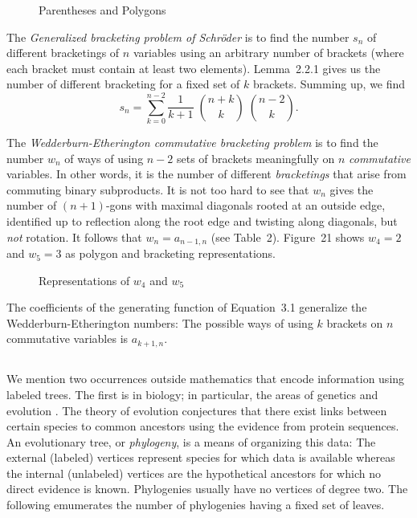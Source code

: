 \documentclass[10pt]{amsart}
\begin{document}
            \begin{figure}[h]
            \caption{Parentheses and Polygons}
            \label{k4}
            \end{figure}
            
            The {\em Generalized bracketing problem of Schr\"oder} is to find the number $s_n$ of different bracketings of $n$ variables using an arbitrary number of brackets (where each bracket must contain at least two elements).  Lemma~2.2.1 gives us the number of different bracketing for a fixed set of $k$ brackets.  Summing up, we find
            $$s_n = \sum_{k=0}^{n-2} \frac{1}{k+1} \; \binom{n+k}{k} \; \binom{n-2}{k}.$$
            
            The {\em Wedderburn-Etherington commutative bracketing problem} is to find the number $w_n$ of ways of using $n-2$ sets of brackets meaningfully on $n$ {\em commutative} variables. In other words, it is the number of different {\em bracketings} that arise from commuting binary subproducts. It is not too hard to see that $w_n$ gives the number of $(n+1)$-gons with maximal diagonals rooted at an outside edge, identified up to reflection along the root edge and twisting along diagonals, but {\em not} rotation.  It follows that $w_n = a_{n-1, n}$ (see Table~2).  Figure~21 shows $w_4 = 2$ and $w_5 = 3$ as polygon and bracketing representations.
            
            \begin{figure}[h]
            \caption{Representations of $w_4$ and $w_5$}
            \label{f:wedder}
            \end{figure}
            
            \begin{rem}
            The coefficients of the generating function of Equation~3.1 generalize the Wedderburn-Etherington numbers:  The possible ways of using $k$ brackets on $n$ commutative variables is $a_{k+1, n}$.
            \end{rem}
            
                        
            \subsection{}
            
            We mention two occurrences outside mathematics that encode information using labeled trees.  The first is in biology; in particular, the areas of genetics and evolution \cite{ph}.  The theory of evolution conjectures that there exist links between certain species to common ancestors using the evidence from protein sequences.  An evolutionary tree, or {\em phylogeny}, is a means of organizing this data: The external (labeled) vertices represent species for which data is available whereas the internal (unlabeled) vertices are the hypothetical ancestors for which no direct evidence is known.  Phylogenies usually have no vertices of degree two.  The following emumerates the number of phylogenies having a fixed set of leaves.
            
\end{document}
